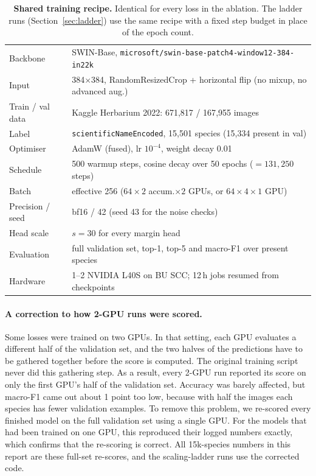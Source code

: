 \documentclass[11pt]{article}
\begin{document}
\begin{table}[t]
\centering
\small
\caption{\textbf{Shared training recipe.} Identical for every loss in the ablation.
The ladder runs (Section~\ref{sec:ladder}) use the same recipe with a fixed step budget
in place of the epoch count.}
\label{tab:setup}
\begin{tabular}{@{}lp{3.95in}@{}}
\toprule
Backbone & SWIN-Base, \nolinkurl{microsoft/swin-base-patch4-window12-384-in22k} \\
Input & 384$\times$384, RandomResizedCrop + horizontal flip (no mixup, no advanced aug.) \\
Train / val data & Kaggle Herbarium 2022: 671{,}817 / 167{,}955 images \\
Label & \texttt{scientificNameEncoded}, 15{,}501 species (15{,}334 present in val) \\
Optimiser & AdamW (fused), lr $10^{-4}$, weight decay 0.01 \\
Schedule & 500 warmup steps, cosine decay over 50 epochs ($=131{,}250$ steps) \\
Batch & effective 256 ($64\times2$ accum.$\times2$ GPUs, or $64\times4\times1$ GPU) \\
Precision / seed & bf16 / 42 (seed 43 for the noise checks) \\
Head scale & $s=30$ for every margin head \\
Evaluation & full validation set, top-1, top-5 and macro-F1 over present species \\
Hardware & 1--2 NVIDIA L40S on BU SCC; 12\,h jobs resumed from checkpoints \\
\bottomrule
\end{tabular}
\end{table}

\paragraph{A correction to how 2-GPU runs were scored.} Some losses were trained on two
GPUs. In that setting, each GPU evaluates a different half of the validation set, and
the two halves of the predictions have to be gathered together before the score is
computed. The original training script never did this gathering step. As a result,
every 2-GPU run reported its score on only the first GPU's half of the validation set.
Accuracy was barely affected, but macro-F1 came out about 1 point too low, because with
half the images each species has fewer validation examples. To remove this problem, we
re-scored every finished model on the full validation set using a single GPU. For the
models that had been trained on one GPU, this reproduced their logged numbers exactly,
which confirms that the re-scoring is correct. All 15k-species numbers in this report
are these full-set re-scores, and the scaling-ladder runs use the corrected code.
\end{document}
